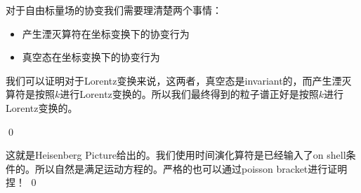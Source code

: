 
对于自由标量场的协变我们需要理清楚两个事情：
\begin{itemize}
  \item 产生湮灭算符在坐标变换下的协变行为
  \item 真空态在坐标变换下的协变行为
\end{itemize}
我们可以证明对于Lorentz变换来说，这两者，真空态是invariant的，而产生湮灭算符是按照$ k
$进行Lorentz变换的。所以我们最终得到的粒子谱正好是按照$ k $进行Lorentz变换的。

\qed


这就是Heisenberg Picture给出的。我们使用时间演化算符是已经输入了on
shell条件的。所以自然是满足运动方程的。严格的也可以通过poisson bracket进行证明捏！
\qed

